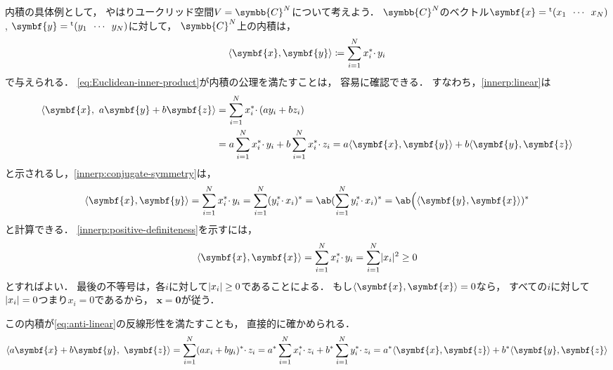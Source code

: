 \documentclass[
]{sotsu}
\begin{document}
\quad
内積の具体例として，
やはりユークリッド空間$V = \symbb{C}^N$について考えよう．
$\symbb{C}^N$のベクトル$\symbf{x} = \cvector{x_1 ; \cdots ; x_N}$, $\symbf{y} = \cvector{y_1 ; \cdots ; y_N}$に対して，
$\symbb{C}^N$上の内積は，
\begin{equation}
    \label{eq:Euclidean-inner-product}
    \iparen{\symbf{x}, \symbf{y}}
        \coloneq \sum_{i = 1}^{N} \conj{x_i} \cdotp y_i
\end{equation}
で与えられる．
\cref{eq:Euclidean-inner-product}が内積の公理を満たすことは，
容易に確認できる．
すなわち，\cref*{innerp:linear}は
\begin{equation*}
    \begin{split}
        \iparen{\symbf{x}, \  a \symbf{y} + b \symbf{z}}
            &= \sum_{i = 1}^{N} \conj{x_i} \cdotp ( a y_i + b z_i )
            \\
            &= a \sum_{i = 1}^{N} \conj{x_i} \cdotp y_i
            + b \sum_{i = 1}^{N} \conj{x_i} \cdotp z_i
            = a \iparen{\symbf{x}, \symbf{y}} + b \iparen{\symbf{y}, \symbf{z}}
    \end{split}
\end{equation*}
と示されるし，\cref*{innerp:conjugate-symmetry}は，
\begin{equation*}
    \iparen{\symbf{x}, \symbf{y}}
        = \sum_{i = 1}^{N} \conj{x_i} \cdotp y_i
        = \sum_{i = 1}^{N} \conj*{ \conj{y_i} \cdotp x_i }
        = \conj{\ab(  \sum_{i = 1}^{N} \conj{y_i} \cdotp x_i  )}
        = \conj{\ab\Big( \iparen{\symbf{y}, \symbf{x}} )}
\end{equation*}
と計算できる．
\cref*{innerp:positive-definiteness}を示すには，
\begin{equation*}
    \iparen{\symbf{x}, \symbf{x}}
        = \sum_{i = 1}^{N} \conj{x_i} \cdotp y_i
        = \sum_{i = 1}^{N} \abs{x_i}^2
        \geq 0
\end{equation*}
とすればよい．
最後の不等号は，各$i$に対して$\lvert x_i\rvert \geq 0$であることによる．
もし$\iparen{\symbf{x}, \symbf{x}} = 0$なら，
すべての$i$に対して$\lvert x_i\rvert = 0$つまり$x_i = 0$であるから，
$\symbf{x} = \symbf{0}$が従う．

この内積が\cref{eq:anti-linear}の反線形性を満たすことも，
直接的に確かめられる．
\begin{equation*}
    \iparen{a \symbf{x} + b \symbf{y}, \  \symbf{z}}
    = \sum_{i = 1}^{N} \conj*{a x_i + b y_i} \cdotp z_i
    = \conj{a} \sum_{i = 1}^{N} \conj{x_i} \cdotp z_i
    + \conj{b} \sum_{i = 1}^{N} \conj{y_i} \cdotp z_i
    = \conj{a} \iparen{\symbf{x}, \symbf{z}} + \conj{b} \iparen{\symbf{y}, \symbf{z}}
\end{equation*}
\end{document}
